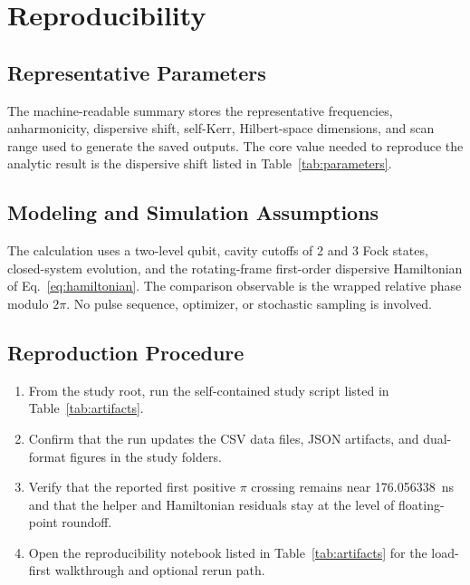 \documentclass[aps,pra,twocolumn,reprint,amsmath,amssymb]{revtex4-2}
\begin{document}
\section{Reproducibility}

\subsection{Representative Parameters}
The machine-readable summary stores the representative frequencies, anharmonicity, dispersive shift, self-Kerr, Hilbert-space dimensions, and scan range used to generate the saved outputs. The core value needed to reproduce the analytic result is the dispersive shift listed in Table~\ref{tab:parameters}.

\subsection{Modeling and Simulation Assumptions}
The calculation uses a two-level qubit, cavity cutoffs of 2 and 3 Fock states, closed-system evolution, and the rotating-frame first-order dispersive Hamiltonian of Eq.~\eqref{eq:hamiltonian}. The comparison observable is the wrapped relative phase modulo $2\pi$. No pulse sequence, optimizer, or stochastic sampling is involved.

\subsection{Reproduction Procedure}
\begin{enumerate}
	\item From the study root, run the self-contained study script listed in Table~\ref{tab:artifacts}.
	\item Confirm that the run updates the CSV data files, JSON artifacts, and dual-format figures in the study folders.
	\item Verify that the reported first positive $\pi$ crossing remains near \SI{176.056338}{\nano\second} and that the helper and Hamiltonian residuals stay at the level of floating-point roundoff.
	\item Open the reproducibility notebook listed in Table~\ref{tab:artifacts} for the load-first walkthrough and optional rerun path.
\end{enumerate}
\end{document}
